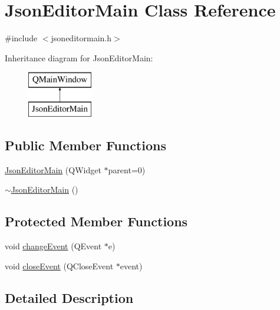 \hypertarget{class_json_editor_main}{}\section{Json\+Editor\+Main Class Reference}
\label{class_json_editor_main}


{\ttfamily \#include $<$jsoneditormain.\+h$>$}

Inheritance diagram for Json\+Editor\+Main\+:\begin{figure}[H]
\begin{center}
\leavevmode
\includegraphics[height=2.000000cm]{class_json_editor_main}
\end{center}
\end{figure}
\subsection*{Public Member Functions}
\begin{DoxyCompactItemize}
\item 
\hyperlink{class_json_editor_main_a26035af11b29baf46d5fd32c288501f0}{Json\+Editor\+Main} (Q\+Widget $\ast$parent=0)
\item 
\hyperlink{class_json_editor_main_a6ed414b7f5f19c6c971053a5a8e83c3a}{$\sim$\+Json\+Editor\+Main} ()
\end{DoxyCompactItemize}
\subsection*{Protected Member Functions}
\begin{DoxyCompactItemize}
\item 
void \hyperlink{class_json_editor_main_a8242322e2557b45ff878ba77bbcc26d9}{change\+Event} (Q\+Event $\ast$e)
\item 
void \hyperlink{class_json_editor_main_a3040d8580a6cd99cb2158b8da0207b97}{close\+Event} (Q\+Close\+Event $\ast$event)
\end{DoxyCompactItemize}


\subsection{Detailed Description}


